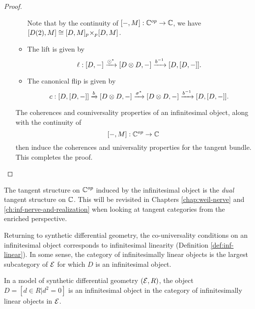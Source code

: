 \begin{proof}
\begin{enumerate}[(i)]
\begin{itemize}
            Note that by the continuity of $[-, M]: \mathbb{C}^{op} \to \mathbb{C}$, we have $[D(2),M] \cong [D,M] {_{p}}\!\times_{p}\! [D,M]$.
            \item The lift is given by
                \[
                    \ell: [D, -] \xrightarrow{\odot^*} [D \otimes D, -] \xrightarrow{b^{-1}} [D,[D,-]]. 
                \]
            \item The canonical flip is given by
                \[
                    c: [D,[D,-]] \xrightarrow{b} [D\otimes D, -] \xrightarrow{\sigma^*} [D\otimes D, -]\xrightarrow{b^{-1}} [D,[D,-]].
                \]
        \end{itemize}
        The coherences and couniversality properties of an infinitesimal object, along with the continuity of 
        \[
            [-,M]: \mathbb{C}^{op} \to \mathbb{C} 
        \]
        then induce the coherences and universality properties for the tangent bundle. This completes the proof.
    \end{enumerate}
\end{proof}
The tangent structure on $\mathbb{C}^{op}$ induced by the infinitesimal object is the \emph{dual} tangent structure on $\mathbb{C}$. This will be revisited in Chapters \ref{chap:weil-nerve} and \ref{ch:inf-nerve-and-realization} when looking at tangent categories from the enriched perspective.

Returning to synthetic differential geometry, the co-universality conditions on an infinitesimal object corresponds to infinitesimal linearity (Definition \ref{def:inf-linear}). In some sense, the category of infinitesimally linear objects is the largest subcategory of $\mathcal{E}$ for which $D$ is an infinitesimal object. 
\begin{corollary}
    In a model of synthetic differential geometry $(\mathcal{E}, R)$, the object $D = [d \in R | d^2 = 0]$ is an infinitesimal object in the category of infinitesimally linear objects in $\mathcal{E}$.
\end{corollary}

